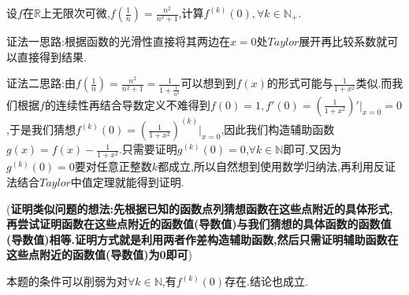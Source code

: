\documentclass[lang=cn,newtx,10pt,scheme=chinese]{../Template/elegantbook}
\begin{document}
\begin{exercise}
    设\(f\)在\(\mathbb{R}\)上无限次可微,\(f\left(\frac{1}{n}\right)=\frac{n^{2}}{n^{2}+1}\),计算\(f^{(k)}(0), \forall k \in \mathbb{N}_{+}\).
\end{exercise}
\begin{note}
    {\color{blue}证法一思路:}根据函数的光滑性直接将其两边在$x=0$处$Taylor$展开再比较系数就可以直接得到结果.

    {\color{blue}证法二思路:}由$f\left( \frac{1}{n} \right) =\frac{n^2}{n^2+1}=\frac{1}{1+\frac{1}{n^2}}$可以想到到$f(x)$的形式可能与$\frac{1}{1+x^2}$类似.而我们根据$f$的连续性再结合导数定义不难得到$f(0)=1,f'(0)=(\frac{1}{1+x^2})'\Big|_{x = 0}=0$,于是我们猜想$f^{(k)}(0) = (\frac{1}{1 + x^2})^{(k)}\Big|_{x = 0}$,因此我们构造辅助函数\(g(x) = f(x) - \frac{1}{1 + x^2}\).只需要证明\(g^{(k)}(0) = 0\),\(\forall k\in \mathbb{N}\)即可.又因为\(g^{(k)}(0) = 0\)要对任意正整数$k$都成立,所以自然想到使用数学归纳法,再利用反证法结合$Taylor$中值定理就能得到证明.

    (\textbf{证明类似问题的想法:先根据已知的函数点列猜想函数在这些点附近的具体形式,再尝试证明函数在这些点附近的函数值(导数值)与我们猜想的具体函数的函数值(导数值)相等.证明方式就是利用两者作差构造辅助函数,然后只需证明辅助函数在这些点附近的函数值(导数值)为0即可})
\end{note}
\begin{remark}
    本题的条件可以削弱为对$\forall k\in \mathbb{N}$,有$f^{(k)}(0)$存在.结论也成立.
\end{remark}
\end{document}
